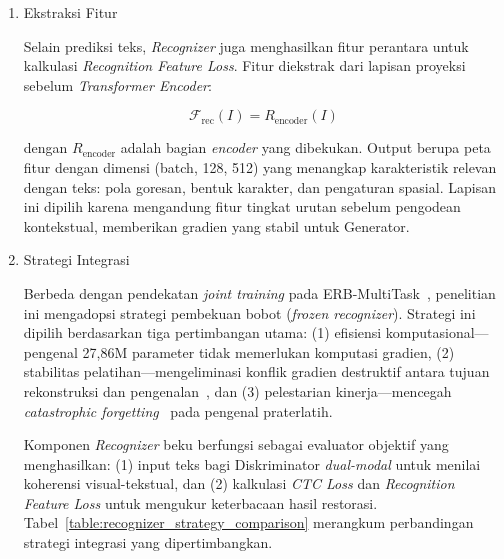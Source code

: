 \documentclass[12pt,a4paper]{article}
\begin{document}
\begin{enumerate}[label=\arabic*., leftmargin=*, wide=0pt, itemsep=1ex]
    \item Ekstraksi Fitur

Selain prediksi teks, \textit{Recognizer} juga menghasilkan fitur perantara untuk kalkulasi \textit{Recognition Feature Loss}. Fitur diekstrak dari lapisan proyeksi sebelum \textit{Transformer Encoder}:

\begin{equation}
  \mathcal{F}_{\text{rec}}(I) = R_{\text{encoder}}(I)
  \label{eq:IV.2}
\end{equation}

\noindent dengan $R_{\text{encoder}}$ adalah bagian \textit{encoder} yang dibekukan. Output berupa peta fitur dengan dimensi (batch, 128, 512) yang menangkap karakteristik relevan dengan teks: pola goresan, bentuk karakter, dan pengaturan spasial. Lapisan ini dipilih karena mengandung fitur tingkat urutan sebelum pengodean kontekstual, memberikan gradien yang stabil untuk Generator.

    \item Strategi Integrasi


Berbeda dengan pendekatan \textit{joint training} pada ERB-MultiTask~\parencite{erb2021}, penelitian ini mengadopsi strategi pembekuan bobot (\textit{frozen recognizer}). Strategi ini dipilih berdasarkan tiga pertimbangan utama: (1) efisiensi komputasional---pengenal 27,86M parameter tidak memerlukan komputasi gradien, (2) stabilitas pelatihan---mengeliminasi konflik gradien destruktif antara tujuan rekonstruksi dan pengenalan~\parencite{souibgui2022,kang2021pay}, dan (3) pelestarian kinerja---mencegah \textit{catastrophic forgetting}~\parencite{kirkpatrick2017overcoming} pada pengenal praterlatih.

Komponen \textit{Recognizer} beku berfungsi sebagai evaluator objektif yang menghasilkan: (1) input teks bagi Diskriminator \textit{dual-modal} untuk menilai koherensi visual-tekstual, dan (2) kalkulasi \textit{CTC Loss} dan \textit{Recognition Feature Loss} untuk mengukur keterbacaan hasil restorasi. Tabel~\ref{table:recognizer_strategy_comparison} merangkum perbandingan strategi integrasi yang dipertimbangkan.
\end{enumerate}
\end{document}
